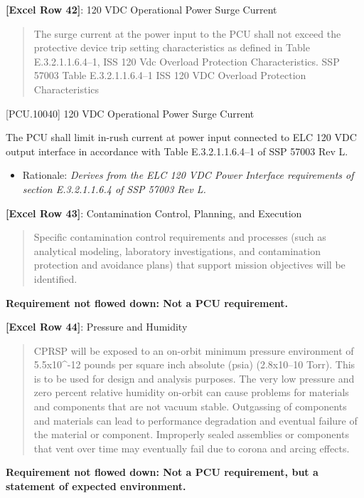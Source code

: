 \textbf{[Excel Row 42]}: 120 VDC Operational Power Surge Current

\begin{quote}
The surge current at the power input to the PCU shall not exceed the protective device trip setting characteristics as defined in Table E.3.2.1.1.6.4--1, ISS 120 Vdc Overload Protection Characteristics.
SSP 57003 Table E.3.2.1.1.6.4--1 ISS 120 VDC Overload Protection Characteristics
\end{quote}

[PCU.10040] 120 VDC Operational Power Surge Current

The PCU shall limit in-rush current at power input connected to ELC 120 VDC output interface in accordance with Table E.3.2.1.1.6.4--1 of SSP 57003 Rev L.

\begin{itemize}
\item{} Rationale: \emph{Derives from the ELC 120 VDC Power Interface requirements of section E.3.2.1.1.6.4 of SSP 57003 Rev L.}

\end{itemize}

\textbf{[Excel Row 43]}: Contamination Control, Planning, and Execution

\begin{quote}
Specific contamination control requirements and processes (such as analytical modeling, laboratory investigations, and contamination protection and avoidance plans) that support mission objectives will be identified.
\end{quote}

\textbf{Requirement not flowed down: Not a PCU requirement.}

\textbf{[Excel Row 44]}: Pressure and Humidity

\begin{quote}
CPRSP will be exposed to an on-orbit minimum pressure environment of 5.5x10\^{}-12 pounds per square inch absolute (psia) (2.8x10--10 Torr). This is to be used for design and analysis purposes. The very low pressure and zero percent relative humidity on-orbit can cause problems for materials and components that are not vacuum stable. Outgassing of components and materials can lead to performance degradation and eventual failure of the material or component. Improperly sealed assemblies or components that vent over time may eventually fail due to corona and arcing effects.
\end{quote}

\textbf{Requirement not flowed down: Not a PCU requirement, but a statement of expected environment.}

